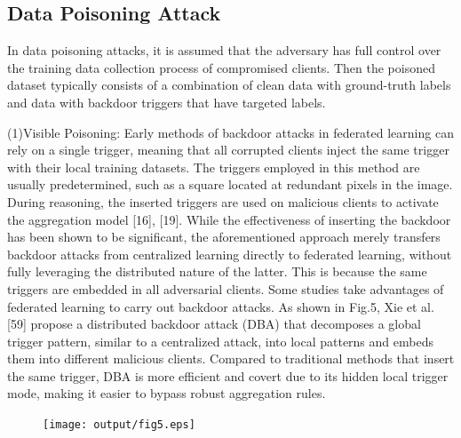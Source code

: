 \subsection{Data Poisoning Attack}  
In data poisoning attacks, it is assumed that the
adversary has full control over the training data collection
process of compromised clients. Then the poisoned dataset
typically consists of a combination of clean data with
ground-truth labels and data with backdoor triggers that
have targeted labels.  

(1)Visible Poisoning: Early methods of backdoor
attacks in federated learning can rely on a single trigger,
meaning that all corrupted clients inject the same trigger
with their local training datasets. The triggers employed
in this method are usually predetermined, such as a
square located at redundant pixels in the image. During
reasoning, the inserted triggers are used on malicious
clients to activate the aggregation model [16], [19]. While
the effectiveness of inserting the backdoor has been shown
to be significant, the aforementioned approach merely
transfers backdoor attacks from centralized learning
directly to federated learning, without fully leveraging the
distributed nature of the latter. This is because the same
triggers are embedded in all adversarial clients. Some
studies take advantages of federated learning to carry out
backdoor attacks. As shown in Fig.5, Xie et al. [59] propose
a distributed backdoor attack (DBA) that decomposes a
global trigger pattern, similar to a centralized attack, into
local patterns and embeds them into different malicious
clients. Compared to traditional methods that insert the
same trigger, DBA is more eﬀicient and covert due to
its hidden local trigger mode, making it easier to bypass
robust aggregation rules. 

\begin{figure}[h]
    \centering
    \texttt{[image: output/fig5.eps]}
     \caption{}
     \label{fig5}
\end{figure}

